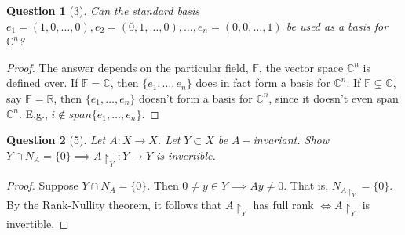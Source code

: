 \documentclass[11pt]{article}
\theoremstyle{quest}
\newtheorem*{question}{Question}
\begin{document}
\begin{question}[3]
Can the standard basis $e_1 = (1, 0, \ldots, 0), e_2 = (0, 1, \ldots, 0), \ldots, e_n = (0, 0, \ldots, 1)$ be used as a basis for $\mathbb{C}^n$?
\end{question}
\begin{proof}
The answer depends on the particular field, $\mathbb{F}$, the  vector space $\mathbb{C}^n$ is defined over. If $\mathbb{F} = \mathbb{C}$, then $\{e_1, \ldots, e_n\}$ does in fact form a basis for $\mathbb{C}^n$. If $\mathbb{F} \subsetneq \mathbb{C}$, say $\mathbb{F} = \mathbb{R}$, then $\{e_1, \ldots, e_n\}$ doesn't form a basis for $\mathbb{C}^n$, since it doesn't even span $\mathbb{C}^n$. E.g., $i \notin span\{e_1, \ldots, e_n\}$.
\end{proof}
\begin{question}[5]
Let $A: X \rightarrow X$. Let $Y \subset X$ be $A-$invariant. Show $Y \cap N_A = \{0\} \implies A \restriction_Y: Y \rightarrow Y$ is invertible.
\end{question}
\begin{proof}
Suppose $Y \cap N_A = \{0\}$. Then $0 \ne y \in Y \implies Ay \ne 0$. That is, $N_{A \restriction_Y} = \{0\}$. By the Rank-Nullity theorem, it follows that $A \restriction_Y$ has full rank $\iff A \restriction_Y$ is invertible.
\end{proof}
\end{document}
